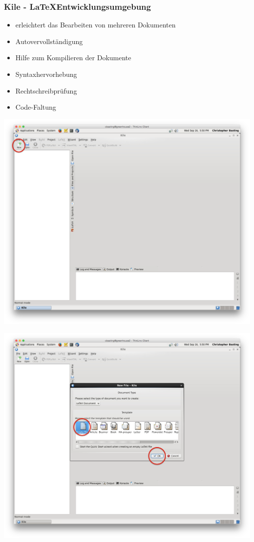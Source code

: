 \begin{frame}
	\frametitle{Kile - \LaTeX Entwicklungsumgebung}
	
	\begin{itemize}
			\item erleichtert das Bearbeiten von mehreren Dokumenten
			\item Autovervollständigung
			\item Hilfe zum Kompilieren der Dokumente
			\item Syntaxhervorhebung
			\item Rechtschreibprüfung
			\item Code-Faltung
	\end{itemize}
\end{frame}

\begin{frame}[plain]
	\includegraphics[width=\textwidth]{screenshots/kile-start.png}
\end{frame}

\begin{frame}
	\includegraphics[width=\textwidth]{screenshots/kile-new.png}
\end{frame}

